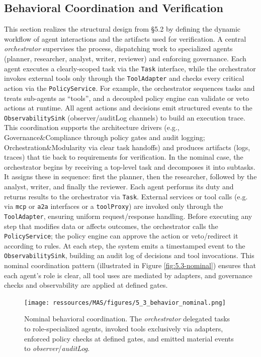 \subsection{Behavioral Coordination and Verification}\label{subsec:behav}
This section realizes the structural design from §5.2 by defining the dynamic workflow of agent interactions and the artifacts used for verification. A central \emph{orchestrator} supervises the process, dispatching work to specialized agents (planner, researcher, analyst, writer, reviewer) and enforcing governance. Each agent executes a clearly-scoped task via the \texttt{Task} interface, while the orchestrator invokes external tools only through the \texttt{ToolAdapter} and checks every critical action via the \texttt{PolicyService}. For example, the orchestrator sequences tasks and treats sub-agents as “tools”, and a decoupled policy engine can validate or veto actions at runtime. All agent actions and decisions emit structured events to the \texttt{ObservabilitySink} (observer/auditLog channels) to build an execution trace. This coordination supports the architecture drivers (e.g., Governance&Compliance through policy gates and audit logging; Orchestration&Modularity via clear task handoffs) and produces artifacts (logs, traces) that tie back to requirements for verification. In the nominal case, the orchestrator begins by receiving a top-level task and decomposes it into subtasks. It assigns these in sequence: first the planner, then the researcher, followed by the analyst, writer, and finally the reviewer. Each agent performs its duty and returns results to the orchestrator via \texttt{Task}. External services or tool calls (e.g. via \texttt{mcp} or \texttt{a2a} interfaces or a \texttt{toolProxy}) are invoked only through the \texttt{ToolAdapter}, ensuring uniform request/response handling. Before executing any step that modifies data or affects outcomes, the orchestrator calls the \texttt{PolicyService}; the policy engine can approve the action or veto/redirect it according to rules. At each step, the system emits a timestamped event to the \texttt{ObservabilitySink}, building an audit log of decisions and tool invocations. This nominal coordination pattern (illustrated in Figure \ref{fig:5.3-nominal}) ensures that each agent’s role is clear, all tool uses are mediated by adapters, and governance checks and observability are applied at defined gates. \begin{figure}[t]
\centering
\texttt{[image: ressources/MAS/figures/5\_3\_behavior\_nominal.png]}
\caption{Nominal behavioral coordination. The \emph{orchestrator} delegated tasks to role-specialized agents, invoked tools exclusively via adapters, enforced policy checks at defined gates, and emitted material events to \emph{observer}/\emph{auditLog}.}

\end{figure}
